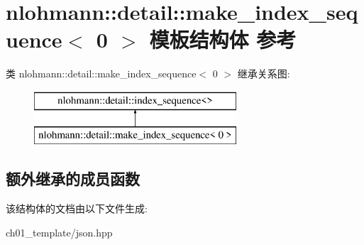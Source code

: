\hypertarget{structnlohmann_1_1detail_1_1make__index__sequence_3_010_01_4}{}\section{nlohmann\+::detail\+::make\+\_\+index\+\_\+sequence$<$ 0 $>$ 模板结构体 参考}
\label{structnlohmann_1_1detail_1_1make__index__sequence_3_010_01_4}
类 nlohmann\+::detail\+::make\+\_\+index\+\_\+sequence$<$ 0 $>$ 继承关系图\+:\begin{figure}[H]
\begin{center}
\leavevmode
\includegraphics[height=2.000000cm]{structnlohmann_1_1detail_1_1make__index__sequence_3_010_01_4}
\end{center}
\end{figure}
\subsection*{额外继承的成员函数}


该结构体的文档由以下文件生成\+:\begin{DoxyCompactItemize}
\item 
ch01\+\_\+template/json.\+hpp\end{DoxyCompactItemize}
